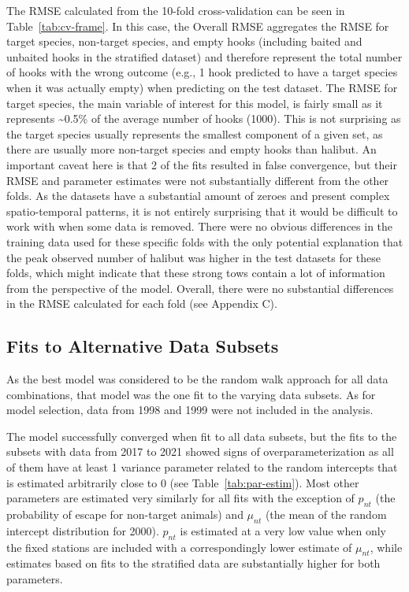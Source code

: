 \documentclass[12pt]{article}\usepackage[]{graphicx}\usepackage[]{color}
\begin{document}
\endgroup{} \endgroup{}

The RMSE calculated from the 10-fold cross-validation can be seen in Table~\ref{tab:cv-frame}. In this case, the Overall RMSE aggregates the RMSE for target species, non-target species, and empty hooks (including baited and unbaited hooks in the stratified dataset) and therefore represent the total number of hooks with the wrong outcome (e.g., 1 hook predicted to have a target species when it was actually empty) when predicting on the test dataset. The RMSE for target species, the main variable of interest for this model, is fairly small as it represents \textasciitilde0.5\% of the average number of hooks (1000). This is not surprising as the target species usually represents the smallest component of a given set, as there are usually more non-target species and empty hooks than halibut. An important caveat here is that 2 of the fits resulted in false convergence, but their RMSE and parameter estimates were not substantially different from the other folds. As the datasets have a substantial amount of zeroes and present complex spatio-temporal patterns, it is not entirely surprising that it would be difficult to work with when some data is removed. There were no obvious differences in the training data used for these specific folds with the only potential explanation that the peak observed number of halibut was higher in the test datasets for these folds, which might indicate that these strong tows contain a lot of information from the perspective of the model. Overall, there were no substantial differences in the RMSE calculated for each fold (see Appendix C).

\hypertarget{fits-to-alternative-data-subsets}{%
\subsection{Fits to Alternative Data Subsets}\label{fits-to-alternative-data-subsets}}

As the best model was considered to be the random walk approach for all data combinations, that model was the one fit to the varying data subsets. As for model selection, data from 1998 and 1999 were not included in the analysis.

The model successfully converged when fit to all data subsets, but the fits to the subsets with data from 2017 to 2021 showed signs of overparameterization as all of them have at least 1 variance parameter related to the random intercepts that is estimated arbitrarily close to 0 (see Table~\ref{tab:par-estim}). Most other parameters are estimated very similarly for all fits with the exception of \(p_{nt}\) (the probability of escape for non-target animals) and \(\mu_{nt}\) (the mean of the random intercept distribution for 2000). \(p_{nt}\) is estimated at a very low value when only the fixed stations are included with a correspondingly lower estimate of \(\mu_{nt}\), while estimates based on fits to the stratified data are substantially higher for both parameters.
\end{document}
